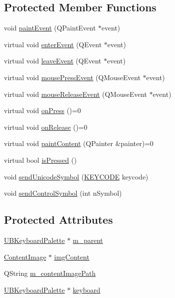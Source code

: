 \subsection*{Protected Member Functions}
\begin{DoxyCompactItemize}
\item 
void \hyperlink{class_u_b_keyboard_button_ab8e3e64907574646b3053718c901033e}{paint\-Event} (Q\-Paint\-Event $\ast$event)
\item 
virtual void \hyperlink{class_u_b_keyboard_button_ab6fed1710da5fa490f75eb3729cbf556}{enter\-Event} (Q\-Event $\ast$event)
\item 
virtual void \hyperlink{class_u_b_keyboard_button_a04983bfac47b032dc287330d688b7233}{leave\-Event} (Q\-Event $\ast$event)
\item 
virtual void \hyperlink{class_u_b_keyboard_button_a34efae023560b22a01fe5f618af56f93}{mouse\-Press\-Event} (Q\-Mouse\-Event $\ast$event)
\item 
virtual void \hyperlink{class_u_b_keyboard_button_aafd68ebd0bbca298178e758d6be992c6}{mouse\-Release\-Event} (Q\-Mouse\-Event $\ast$event)
\item 
virtual void \hyperlink{class_u_b_keyboard_button_aab34537366dea90f113b85dac6da80d9}{on\-Press} ()=0
\item 
virtual void \hyperlink{class_u_b_keyboard_button_a92423df2600435a21ae871fca421d4bd}{on\-Release} ()=0
\item 
virtual void \hyperlink{class_u_b_keyboard_button_ac4a441fad9d6cb8d63a54318e6738eac}{paint\-Content} (Q\-Painter \&painter)=0
\item 
virtual bool \hyperlink{class_u_b_keyboard_button_a2b1e4f52156ee54eee490126e07537a3}{is\-Pressed} ()
\item 
void \hyperlink{class_u_b_keyboard_button_a7b7c22df6975f5c884549f0b3b0319b7}{send\-Unicode\-Symbol} (\hyperlink{struct_k_e_y_c_o_d_e}{K\-E\-Y\-C\-O\-D\-E} keycode)
\item 
void \hyperlink{class_u_b_keyboard_button_a5374d35bdf3793d8fc13c13d7a96efdf}{send\-Control\-Symbol} (int n\-Symbol)
\end{DoxyCompactItemize}
\subsection*{Protected Attributes}
\begin{DoxyCompactItemize}
\item 
\hyperlink{class_u_b_keyboard_palette}{U\-B\-Keyboard\-Palette} $\ast$ \hyperlink{class_u_b_keyboard_button_a4942440a8d820ed502f2d36f63882d64}{m\-\_\-parent}
\item 
\hyperlink{class_content_image}{Content\-Image} $\ast$ \hyperlink{class_u_b_keyboard_button_a72d0a599d85f6cb818ff818fd101afbb}{img\-Content}
\item 
Q\-String \hyperlink{class_u_b_keyboard_button_af438d7515d8543b827e9ec6d3cf63f09}{m\-\_\-content\-Image\-Path}
\item 
\hyperlink{class_u_b_keyboard_palette}{U\-B\-Keyboard\-Palette} $\ast$ \hyperlink{class_u_b_keyboard_button_a24bb19c40ac54159a6cccac7d2b17202}{keyboard}
\end{DoxyCompactItemize}


